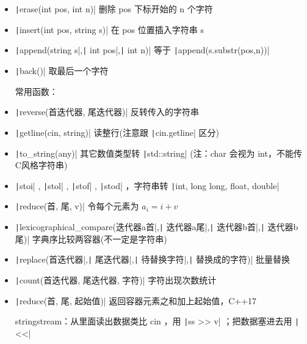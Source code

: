\documentclass[twocolumn,10pt]{ctexart}
\begin{document}
\begin{itemize}
\item \texttt|erase(int pos, int n)| 删除 pos 下标开始的 n 个字符
\end{itemize}

\begin{itemize}
\item \texttt|insert(int pos, string s)| 在 pos 位置插入字符串 s
\end{itemize}

\begin{itemize}
\item \texttt|append(string s|,\allowbreak \texttt| int pos|,\allowbreak \texttt| int n)| 等于 \texttt|append(s.substr(pos,n))|
\end{itemize}

\begin{itemize}
\item \texttt|back()| 取最后一个字符

常用函数：
\end{itemize}

\begin{itemize}
\item \texttt|reverse(首迭代器, 尾迭代器)| 反转传入的字符串
\item \texttt|getline(cin, string)| 读整行(注意跟 \texttt|cin.getline| 区分)
\item \texttt|to_string(any)| 其它数值类型转 \texttt|std::string| (注：char 会视为 int，不能传C风格字符串)
\item \texttt|stoi| , \texttt|stol| , \texttt|stof| , \texttt|stod| ，字符串转 \texttt|int, long long, float, double|
\item \texttt|reduce(首, 尾, v)| 令每个元素为 $a_i=i+v$
\item \texttt|lexicographical_compare(迭代器a首|,\allowbreak \texttt| 迭代器a尾|,\allowbreak \texttt| 迭代器b首|,\allowbreak \texttt| 迭代器b尾)| 字典序比较两容器(不一定是字符串)
\item \texttt|replace(首迭代器|,\allowbreak \texttt| 尾迭代器|,\allowbreak \texttt| 待替换字符|,\allowbreak \texttt| 替换成的字符)| 批量替换
\item \texttt|count(首迭代器, 尾迭代器, 字符)| 字符出现次数统计
\item \texttt|reduce(首, 尾, 起始值)| 返回容器元素之和加上起始值，C++17

stringstream：从里面读出数据类比 cin ，用 \texttt|ss >> v| ；把数据塞进去用 \texttt|<<|
\end{itemize}
\end{document}
